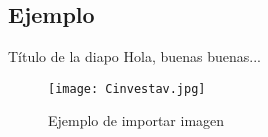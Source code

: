 \subsection{Ejemplo} %

\begin{frame}{Título de la diapo}
    Hola, buenas buenas... 
    
    \begin{figure}[h]

        
        \texttt{[image: Cinvestav.jpg]}
        \centering
        \caption{ Ejemplo de importar imagen }
        \label{fig:ejemplo}
    \end{figure}

\end{frame}